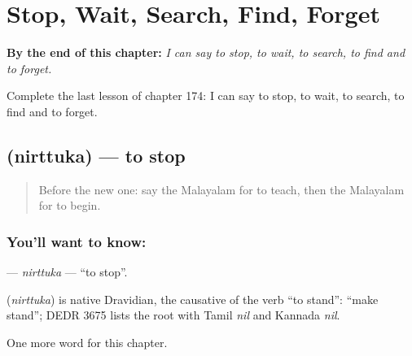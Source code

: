 
\chapter{Stop, Wait, Search, Find, Forget}
\label{ch:ml-stop-wait-search-find-forget}

\begin{chapteropening}
\textbf{By the end of this chapter:} \emph{I can say to stop, to wait, to search, to find and to forget.}

Complete the last lesson of chapter 174: I can say to stop, to wait, to search, to find and to forget.
\end{chapteropening}

\section[\texorpdfstring{\ml{നിർത്തുക} (nirttuka)}{നിർത്തുക (nirttuka)}]{ (nirttuka) — to stop}

\label{lesson:ML-C174-nirttuka}



\begin{quote}
Before the new one: say the Malayalam for to teach, then the Malayalam for to begin.
\end{quote}

\subsection*{You'll want to know: }
\textbf{} — \emph{nirttuka} — \textquotedblleft{}to stop\textquotedblright{}.

\begin{cousinweb}
\textbf{} (\emph{nirttuka}) is native Dravidian, the causative of the verb \textquotedblleft{}to stand\textquotedblright{}: \textquotedblleft{}make stand\textquotedblright{}; DEDR 3675 lists the root with Tamil \emph{nil} and Kannada \emph{nil}.
\end{cousinweb}

\begin{grammarlens}[title={What you've built}]
One more word for this chapter.
\end{grammarlens}

